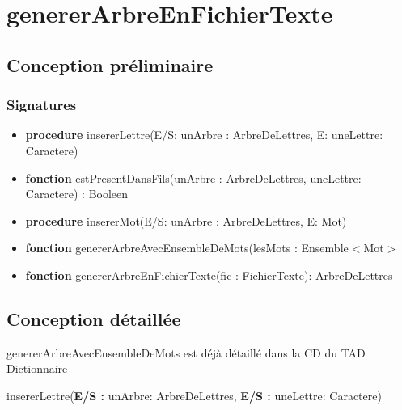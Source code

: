 \documentclass{article}
\begin{document}
    \pagestyle{empty}
    \noindent

    \section*{genererArbreEnFichierTexte}
    \subsection*{Conception préliminaire}
    
    \subsubsection*{Signatures}

	\begin{itemize}[label=$\ $, leftmargin=1cm]
         \item \textbf{procedure } insererLettre(E/S: unArbre : ArbreDeLettres, E: uneLettre: Caractere)
         \item \textbf{fonction} estPresentDansFils(unArbre : ArbreDeLettres, uneLettre: Caractere) : Booleen
         \item \textbf{procedure} insererMot(E/S: unArbre : ArbreDeLettres, E: Mot)
         \item \textbf{fonction} genererArbreAvecEnsembleDeMots(lesMots : Ensemble$<$Mot$>$
		 \item \textbf{fonction} genererArbreEnFichierTexte(fic : FichierTexte): ArbreDeLettres
		 
		
		 
         
         
	\end{itemize} 
         

    \subsection*{Conception détaillée}
    genererArbreAvecEnsembleDeMots est déjà détaillé dans la CD du TAD Dictionnaire
    
    \begin{procedure}
        \SetAlgoLined
        \caption{insererLettre(\textbf{E/S :} unArbre: ArbreDeLettres, \textbf{E/S :} uneLettre: Caractere) }
    \end{procedure}
    
\end{document}
